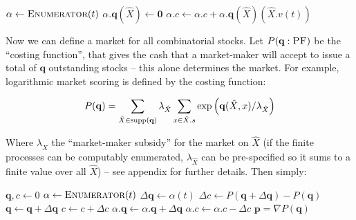 \documentclass{article}
\begin{document}
\begin{algorithm}
\begin{algorithmic}
            \State $\alpha\gets\Enumerator{t}$
             
                 
                    \State $\alpha.\mathbf{q}(\hat{X})\gets \mathbf{0}$ 
                    \State $\alpha.c \gets \alpha.c + \alpha.\mathbf{q}(\hat{X})(\hat{X}.v(t))$ 
                \EndIf
            \EndFor
        \EndWhile
    \EndFunction
\end{algorithmic}
\end{algorithm}

Now we can define a market for all combinatorial stocks. Let $P(\mathbf{q}:\PF)$ be the ``costing function'', that gives the cash that a market-maker will accept to issue a total of $\mathbf{q}$ outstanding stocks -- this alone determines the market. For example, logarithmic market scoring \cite{hanson_logarithmic_2002} is defined by the costing function:

\begin{equation*}
    P(\mathbf{q}) = \sum_{\hat{X}\in \operatorname{supp}\left(\mathbf{q}\right)}{\lambda_{\hat{X}}\sum_{x\in\hat{X}.s}{\exp\left(\mathbf{q}(\hat{X}, x)/\lambda_{\hat{X}}\right)}}
\end{equation*}

Where $\lambda_{\hat{X}}$ the ``market-maker subsidy'' for the market on $\hat{X}$ (if the finite processes can be computably enumerated, $\lambda_{\hat{X}}$ can be pre-specified so it sums to a finite value over all $\hat{X}$) -- see appendix for further details. Then simply:

\begin{algorithm}
\begin{algorithmic}
    \State $\mathbf{q}, c \gets 0$ 
        \State $\alpha\gets\Enumerator{t}$
        \State $\Delta\mathbf{q} \gets \alpha(t)$
        \State $\Delta c \gets P(\mathbf{q}+\Delta\mathbf{q})-P(\mathbf{q})$
            \State $\mathbf{q}\gets\mathbf{q}+\Delta\mathbf{q}$
            \State $c \gets c + \Delta c$ 
            \State $\alpha.\mathbf{q}\gets\alpha.\mathbf{q}+\Delta \mathbf{q}$
            \State $\alpha.c\gets\alpha.c-\Delta c$
        \EndIf
        \State $\mathbf{p}=\nabla P(\mathbf{q})$
    \EndWhile
\EndFunction
\end{algorithmic}
\end{algorithm}
\end{document}
